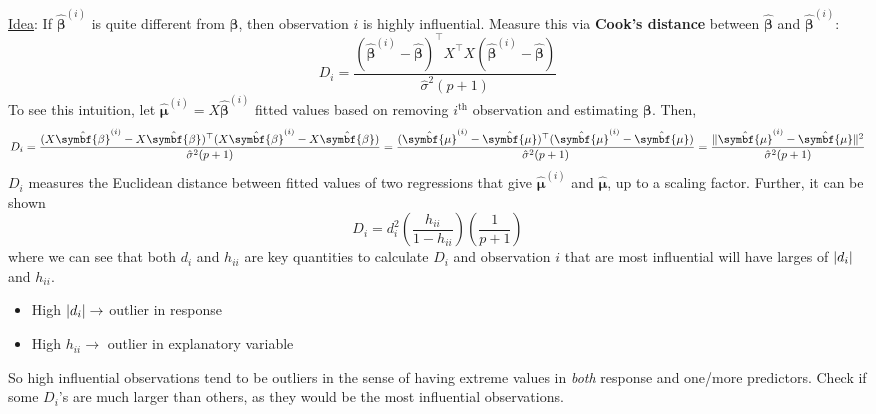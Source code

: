 \begin{enumerate}[(1)]
          \underline{Idea}: If $ \hat{\symbf{\beta}}^{(i)} $
          is quite different from $ \hat{\symbf{\beta}} $, then
          observation $ i $ is highly influential. Measure this
          via \textbf{Cook's distance} between $ \hat{\symbf{\beta}} $
          and $ \hat{\symbf{\beta}}^{(i)} $:
          \[ D_i=\frac{(\hat{\symbf{\beta}}^{(i)}-\hat{\symbf{\beta}})^{\top}
                  X^\top X(\hat{\symbf{\beta}}^{(i)}-\hat{\symbf{\beta}})}{
                  \hat{\sigma}^2(p+1)
              }  \]
          To see this intuition, let $ \hat{\symbf{\mu}}^{(i)}=X\hat{\symbf{\beta}}^{(i)} $
          fitted values based on removing $ i^{\text{th}} $ observation and
          estimating $ \symbf{\beta} $. Then,
          \[ D_i=\frac{(X\hat{\symbf{\beta}}^{(i)}-X\hat{\symbf{\beta}})^{\top}
                  (X\hat{\symbf{\beta}}^{(i)}-X\hat{\symbf{\beta}})}{
                  \hat{\sigma}^2(p+1)
              }=\frac{(\hat{\symbf{\mu}}^{(i)}-\hat{\symbf{\mu}})^\top
                  (\hat{\symbf{\mu}}^{(i)}-\hat{\symbf{\mu}})
              }{
                  \hat{\sigma}^2(p+1)
              }=\frac{
                  \norm{\hat{\symbf{\mu}}^{(i)}
                      -\hat{\symbf{\mu}}}^2
              }{
                  \hat{\sigma}^2(p+1)
              }    \]
          $ D_i $ measures the Euclidean distance between fitted
          values of two regressions that give
          $ \hat{\symbf{\mu}}^{(i)} $ and $ \hat{\symbf{\mu}} $,
          up to a scaling factor. Further, it can be shown
          \[ D_i=d_i^2\left( \frac{h_{ii}}{1-h_{ii}} \right)
              \left( \frac{1}{p+1} \right) \]
          where we can see that both $ d_i $ and $ h_{ii} $
          are key quantities to calculate $ D_i $ and
          observation $ i $ that are most influential will have
          larges of $ \lvert d_i\rvert $ and $ h_{ii} $.
          \begin{itemize}
              \item High $ \lvert d_i\rvert\rightarrow $ outlier in response
              \item High $ h_{ii}\rightarrow $ outlier in explanatory variable
          \end{itemize}
          So high influential observations tend to be outliers
          in the sense of having extreme values in \emph{both}
          response and one/more predictors. Check if some
          $ D_i $'s are much larger than others,
          as they would be the most influential observations.
\end{enumerate}

